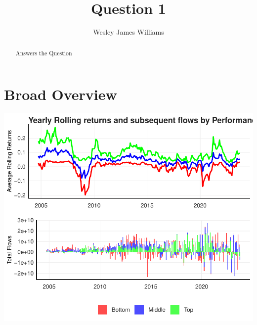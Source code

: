 \documentclass[12pt,preprint, authoryear]{elsarticle}
\numberwithin{equation}{section}
\numberwithin{figure}{section}
\numberwithin{table}{section}
\begin{document}
\begin{frontmatter}  %

\title{Question 1}





\author[Add1]{Wesley James Williams}





\address[Add1]{Stellenbosch University, South Africa}


\begin{abstract}
\small{
Answers the Question
}
\end{abstract}

\vspace{1cm}





\vspace{0.5cm}

\end{frontmatter}

\setcounter{footnote}{0}



\pagestyle{fancy}
\chead{}
\rhead{}
\lfoot{}
\lhead{}
\cfoot{}


\headsep 35pt %




\hypertarget{broad-overview}{%
\section{Broad Overview}\label{broad-overview}}

\includegraphics{Question-4_files/figure-latex/unnamed-chunk-3-1.pdf}
\end{document}
